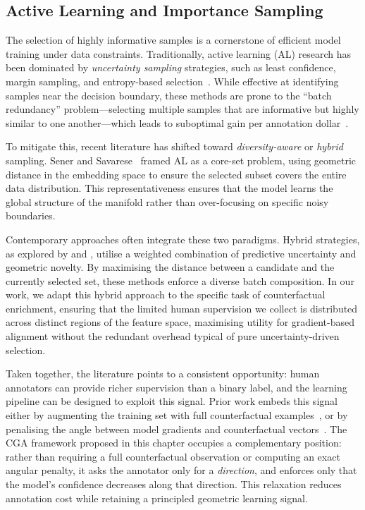 \subsection{Active Learning and Importance Sampling}

The selection of highly informative samples is a cornerstone of efficient model training under data constraints. Traditionally, active learning (AL) research has been dominated by \textit{uncertainty sampling} strategies, such as least confidence, margin sampling, and entropy-based selection~\cite{settles2009active}. While effective at identifying samples near the decision boundary, these methods are prone to the ``batch redundancy'' problem—selecting multiple samples that are informative but highly similar to one another—which leads to suboptimal gain per annotation dollar~\cite{shen2018deepactivelearningnamed}.

To mitigate this, recent literature has shifted toward \textit{diversity-aware} or \textit{hybrid} sampling. Sener and Savarese~\cite{sener2018activelearning} framed AL as a core-set problem, using geometric distance in the embedding space to ensure the selected subset covers the entire data distribution. This representativeness ensures that the model learns the global structure of the manifold rather than over-focusing on specific noisy boundaries. 

Contemporary approaches often integrate these two paradigms. Hybrid strategies, as explored by \citet{citovsky2021batchactivelearningscale} and \citet{ash2020deepbatchactivelearning}, utilise a weighted combination of predictive uncertainty and geometric novelty. By maximising the distance between a candidate and the currently selected set, these methods enforce a diverse batch composition. In our work, we adapt this hybrid approach to the specific task of counterfactual enrichment, ensuring that the limited human supervision we collect is distributed across distinct regions of the feature space, maximising utility for gradient-based alignment without the redundant overhead typical of pure uncertainty-driven selection.

Taken together, the literature points to a consistent opportunity: human annotators can provide richer supervision than a binary label, and the learning pipeline can be designed to exploit this signal. Prior work embeds this signal either by augmenting the training set with full counterfactual examples~\cite{Kaushik2020Learning}, or by penalising the angle between model gradients and counterfactual vectors~\cite{teney2020learning}. The CGA framework proposed in this chapter occupies a complementary position: rather than requiring a full counterfactual observation or computing an exact angular penalty, it asks the annotator only for a \emph{direction}, and enforces only that the model's confidence decreases along that direction. This relaxation reduces annotation cost while retaining a principled geometric learning signal.



